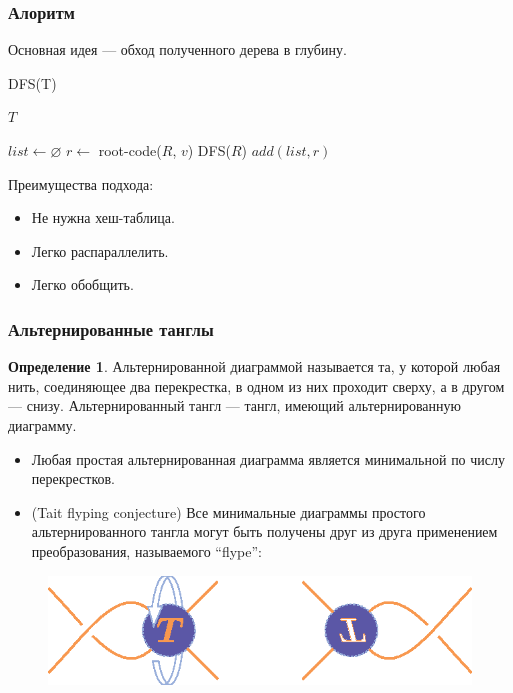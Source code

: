 \documentclass[dvips, intlimits, 9pt, unicode, notheorems, color=usenames,dvipsnames]{beamer}
\theoremstyle{plain}
\theoremstyle{definition}
\newtheorem{definition}{Определение}
\begin{document}
	\begin{frame}
		\frametitle{Алоритм}

		Основная идея --- обход полученного дерева в глубину.
		\begin{block}{DFS(T)}
		{
			\footnotesize
			\begin{algorithmic}[H]
				\PRINT $T$
					\RETURN
				\ENDIF

				\STATE $list \leftarrow \varnothing$
							\STATE $r \leftarrow $ root-code($R$, $v$)
								\STATE DFS($R$)
								\STATE $add(list, r)$
							\ENDIF
						\ENDIF
					\ENDIF
				\ENDFOR
			\end{algorithmic}
		}
		\end{block}

		Преимущества подхода:
		\begin{itemize}
			\item Не нужна хеш-таблица.
			\item Легко распараллелить.
			\item Легко обобщить.
		\end{itemize}
	\end{frame}


	\begin{frame}
		\frametitle{Альтернированные танглы}

		\begin{definition}
			Альтернированной диаграммой называется та, у которой любая нить, соединяющее два перекрестка, в одном из них проходит
			сверху, а в другом --- снизу. Альтернированный тангл --- тангл, имеющий альтернированную диаграмму.
		\end{definition}

		\begin{itemize}
			\item Любая простая альтернированная диаграмма является минимальной по числу перекрестков.
			\item (Tait flyping conjecture) Все минимальные диаграммы простого альтернированного тангла могут быть
			получены друг из друга применением преобразования, называемого “flype”:
		\end{itemize}

		\begin{figure}[ht]
			\centering
			\includegraphics[scale = 1]{c/flype.eps}
		\end{figure}
	\end{frame}
\end{document}
